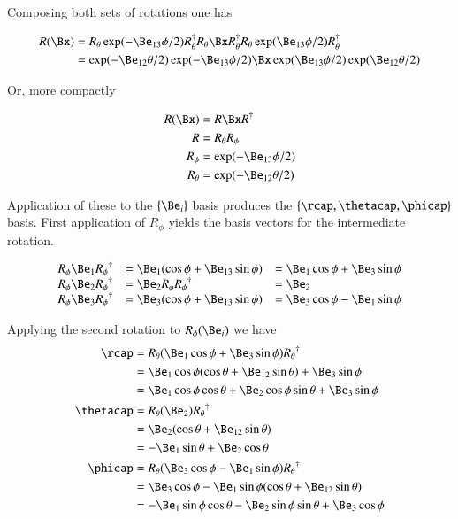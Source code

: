 Composing both sets of rotations one has

\begin{align*}
R(\Bx) 
&= R_\theta \exp( - \Be_{13} \phi/2 ) R_\theta^\dagger R_\theta \Bx R_\theta^\dagger R_\theta \exp( \Be_{13} \phi/2 ) R_\theta^\dagger \\
&= \exp( - \Be_{12} \theta/2 ) \exp( - \Be_{13} \phi/2 ) \Bx \exp( \Be_{13} \phi/2 ) \exp( \Be_{12} \theta/2 ) \\
\end{align*}

Or, more compactly

\begin{align}
R(\Bx) &= R \Bx R^\dagger \\
R &= R_\theta R_\phi \\
R_\phi &= \exp(-\Be_{13}\phi/2) \\
R_\theta &= \exp(-\Be_{12}\theta/2)
\end{align}

Application of these to the $\{\Be_i\}$ basis produces the $\{\rcap, \thetacap, \phicap\}$ basis.  First application 
of $R_\phi$ yields the basis vectors for the intermediate rotation.

\begin{align*}
\begin{array}{l l l}
{R_\phi}\Be_1 {R_\phi}^\dagger &= \Be_1 (\cos\phi + \Be_{13} \sin\phi) &= \Be_1 \cos\phi + \Be_3 \sin\phi \\
{R_\phi}\Be_2 {R_\phi}^\dagger &= \Be_2 R_\phi {R_\phi}^\dagger &= \Be_2 \\
{R_\phi}\Be_3 {R_\phi}^\dagger &= \Be_3 (\cos\phi + \Be_{13} \sin\phi) &= \Be_3 \cos\phi - \Be_1 \sin\phi \\
\end{array}
\end{align*}

Applying the second rotation to $R_\phi(\Be_i)$ we have
\begin{align*}
\rcap 
&= {R_\theta}( \Be_1 \cos\phi + \Be_3 \sin\phi ) {R_\theta}^\dagger \\
&=
\Be_1 \cos\phi (\cos\theta + \Be_{12} \sin\theta)
+ \Be_3 \sin\phi \\
&=
\Be_1 \cos\phi \cos\theta 
+ \Be_2 \cos\phi \sin\theta
+ \Be_3 \sin\phi \\
\thetacap
&= {R_\theta} ( \Be_2 ) {R_\theta}^\dagger \\
&= \Be_2 (\cos\theta + \Be_{12} \sin\theta) \\
&= - \Be_1 \sin\theta + \Be_2 \cos\theta \\
\phicap
&= {R_\theta} ( \Be_3 \cos\phi - \Be_1 \sin\phi ) {R_\theta}^\dagger \\
&= \Be_3 \cos\phi - \Be_1 \sin\phi (\cos\theta + \Be_{12} \sin\theta) \\
&= 
- \Be_1 \sin\phi \cos\theta 
- \Be_2 \sin\phi \sin\theta 
+ \Be_3 \cos\phi
\\
\end{align*}

